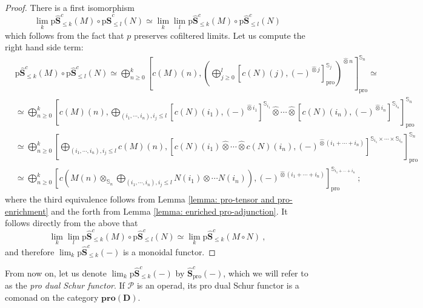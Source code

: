 \documentclass[a4paper,12pt]{amsart}
\theoremstyle{plain}
\theoremstyle{definition}
\theoremstyle{remark}
\begin{document}
\begin{proof}
There is a first isomorphism 
\[
\lim_k \mathrm{p}\widehat{\mathbf{S}}^c_{\leq k}(M) \circ \mathrm{p}\widehat{\mathbf{S}}^c_{\leq l}(N) \simeq \lim_k \lim_l \mathrm{p}\widehat{\mathbf{S}}^c_{\leq k}(M) \circ \mathrm{p}\widehat{\mathbf{S}}^c_{\leq l}(N)
\]
which follows from the fact that $p$ preserves cofiltered limits. Let us compute the right hand side term:
\begin{align*}
&\mathrm{p}\widehat{\mathbf{S}}^c_{\leq k}(M) \circ \mathrm{p}\widehat{\mathbf{S}}^c_{\leq l}(N) \simeq \bigoplus_{n \geq 0}^{k} \left[c(M)(n),\left(\bigoplus_{j \geq 0}^{l} \left[c(N)(j),(-)^{\widehat{\otimes} j} \right]^{\mathbb{S}_j}_{\mathrm{pro}} \right)^{\widehat{\otimes} n} \right]^{\mathbb{S}_n}_{\mathrm{pro}} \simeq \\
&\simeq \bigoplus_{n \geq 0}^{k} \left[c(M)(n),\bigoplus_{(i_1,\cdots,i_n), i_j \leq l} \left[c(N)(i_1),(-)^{\widehat{\otimes} i_1} \right]^{\mathbb{S}_{i_1}} \widehat{\otimes} \cdots \widehat{\otimes} \left[c(N)(i_n),(-)^{\widehat{\otimes} i_n} \right]^{\mathbb{S}_{i_n}} \right]^{\mathbb{S}_n}_{\mathrm{pro}} \\
&\simeq \bigoplus_{n \geq 0}^{k} \left[\bigoplus_{(i_1,\cdots,i_n), i_j \leq l} c(M)(n), \left[c(N)(i_1)\widehat{\otimes} \cdots \widehat{\otimes} c(N)(i_n),(-)^{\widehat{\otimes} (i_1 + \cdots + i_n)} \right]^{\mathbb{S}_{i_1} \times \cdots \times \mathbb{S}_{i_n}} \right]^{\mathbb{S}_n}_{\mathrm{pro}} \\
&\simeq \bigoplus_{n \geq 0}^{k} \left[c\left(M(n) \otimes_{\mathbb{S}_n} \bigoplus_{(i_1,\cdots,i_n), i_j \leq l} N(i_1) \otimes \cdots N(i_n)\right), (-)^{\widehat{\otimes} (i_1 + \cdots + i_n)} \right]^{\mathbb{S}_{i_1 + \cdots + i_n}}_{\mathrm{pro}}~;
\end{align*}where the third equivalence follows from Lemma \ref{lemma: pro-tensor and pro-enrichment} and the forth from Lemma \ref{lemma: enriched pro-adjunction}. It follows directly from the above that
\[
\lim_k \lim_l \mathrm{p}\widehat{\mathbf{S}}^c_{\leq k}(M) \circ \mathrm{p}\widehat{\mathbf{S}}^c_{\leq l}(N) \simeq \lim_k \mathrm{p}\widehat{\mathbf{S}}^c_{\leq k}(M \circ N)~,
\]
and therefore $\lim_k \mathrm{p}\widehat{\mathbf{S}}^c_{\leq k}(-)$ is a monoidal functor. 
\end{proof}

From now on, let us denote $\lim_k \mathrm{p}\widehat{\mathbf{S}}^c_{\leq k}(-)$ by $\widehat{\mathbf{S}}^c_{\mathrm{pro}}(-)$, which we will refer to as the \textit{pro dual Schur functor}. If $\mathscr{P}$ is an operad, its pro dual Schur functor is a comonad on the category $\mathbf{pro}(\mathbf{D})$. 
\end{document}
